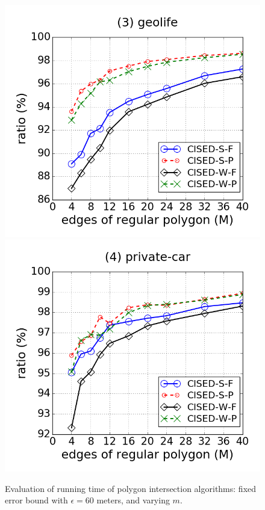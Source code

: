 \begin{figure}[tb!]
\includegraphics[scale = 0.250]{figures/Exp-M-poly-time-ratio-geolife.png}
\includegraphics[scale = 0.250]{figures/Exp-M-poly-time-ratio-private.png}
\vspace{-2ex}
\caption{\small Evaluation of running time of polygon intersection algorithms: fixed error bound with $\epsilon=60$ meters, and varying $m$.}
\label{fig:m-poly-time}
\vspace{-2ex}
\end{figure}


